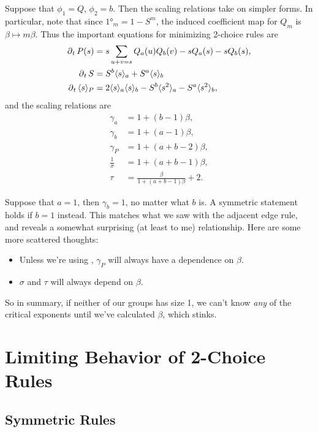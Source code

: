 \documentclass[twoside,10pt]{article}
\begin{document}
Suppose that $\phi_1 = Q$, $\phi_2 = b$. Then the scaling relations take on simpler forms. In particular, note that since $\ang{1}_{m} = 1 - S^{m}$, the induced coefficient map for $Q_m$ is $\beta \mapsto m \beta$. Thus the important equations for minimizing 2-choice rules are
\begin{align*}
        \operatorname{\partial}_{t}{P(s)} &= s \sum_{u+v=s} Q_a(u) Q_b(v) - s Q_a(s) - s Q_b(s),\\
        \operatorname{\partial}_{t}{S} &= S^{b}\langle s \rangle_{a} + S^{a}\langle s \rangle_{b}\\        \operatorname{\partial}_{t}{\langle s \rangle_{P}} &= 2 \langle s \rangle_{a}\langle s \rangle_{b} - S^{b}\langle s^{2} \rangle_{a} - S^{a}\langle s^{2} \rangle_{b},
\end{align*}
and the scaling relations are
\begin{align*}
        \gamma_{a} &= 1 + (b-1)\beta,\\
        \gamma_{b} &= 1+(a-1)\beta,\\
        \gamma_{P} &= 1+(a+b-2)\beta,\\
        \frac{1}{\sigma} &= 1+(a+b-1)\beta,\\
        \tau &= \frac{\beta}{1+(a+b-1)\beta} +2.
\end{align*}

Suppose that $a=1$, then $\gamma_b=1$, no matter what $b$ is. A symmetric statement holds if $b=1$ instead. This matches what we saw with the adjacent edge rule, and reveals a somewhat surprising (at least to me) relationship. Here are some more scattered thoughts:
\begin{itemize}
        \item Unless we're using \ER, $\gamma_{P}$ will always have a dependence on $\beta$.
        \item $\sigma$ and $\tau$ will always depend on $\beta$.
\end{itemize}
So in summary, if neither of our groups has size 1, we can't know \textit{any} of the critical exponents until we've calculated $\beta$, which stinks.

\section{Limiting Behavior of 2-Choice Rules}

\subsection{Symmetric Rules}
\end{document}
